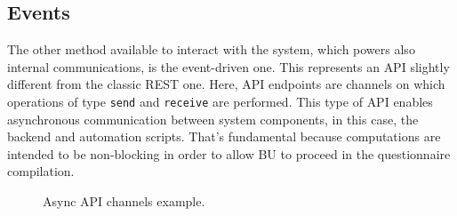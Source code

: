 \documentclass[12pt,a4paper,openright,twoside]{book}
\begin{document}
\subsection{Events}

The other method available to interact with the system, which powers also internal communications, is the event-driven one.
%
This represents an \ac{API} slightly different from the classic REST one. 
%
Here, \ac{API} endpoints are channels on which operations of type \texttt{send} and \texttt{receive} are performed.
%
This type of \ac{API} enables asynchronous communication between system components, in this case, the backend and automation scripts.
%
That's fundamental because computations are intended to be non-blocking in order to allow \ac{BU} to proceed in the questionnaire compilation.

\begin{figure}
    \centering
    \hfill
    
    \caption{Async \ac{API} channels example.}%
    \label{fig:async-api}
\end{figure}
\end{document}
